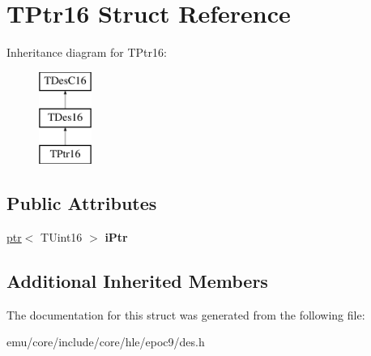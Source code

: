 \hypertarget{struct_t_ptr16}{}\section{T\+Ptr16 Struct Reference}
\label{struct_t_ptr16}
Inheritance diagram for T\+Ptr16\+:\begin{figure}[H]
\begin{center}
\leavevmode
\includegraphics[height=3.000000cm]{struct_t_ptr16}
\end{center}
\end{figure}
\subsection*{Public Attributes}
\begin{DoxyCompactItemize}
\item 
\mbox{\label{struct_t_ptr16_a22138f1d182be67d42d237bac096b4b0}} 
\mbox{\hyperlink{classeka2l1_1_1ptr}{ptr}}$<$ T\+Uint16 $>$ {\bfseries i\+Ptr}
\end{DoxyCompactItemize}
\subsection*{Additional Inherited Members}


The documentation for this struct was generated from the following file\+:\begin{DoxyCompactItemize}
\item 
emu/core/include/core/hle/epoc9/des.\+h\end{DoxyCompactItemize}
